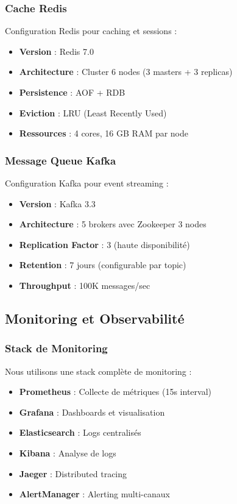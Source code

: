 \subsubsection{Cache Redis}

Configuration Redis pour caching et sessions :
\begin{itemize}
    \item \textbf{Version} : Redis 7.0
    \item \textbf{Architecture} : Cluster 6 nodes (3 masters + 3 replicas)
    \item \textbf{Persistence} : AOF + RDB
    \item \textbf{Eviction} : LRU (Least Recently Used)
    \item \textbf{Ressources} : 4 cores, 16 GB RAM par node
\end{itemize}

\subsubsection{Message Queue Kafka}

Configuration Kafka pour event streaming :
\begin{itemize}
    \item \textbf{Version} : Kafka 3.3
    \item \textbf{Architecture} : 5 brokers avec Zookeeper 3 nodes
    \item \textbf{Replication Factor} : 3 (haute disponibilité)
    \item \textbf{Retention} : 7 jours (configurable par topic)
    \item \textbf{Throughput} : 100K messages/sec
\end{itemize}

\subsection{Monitoring et Observabilité}

\subsubsection{Stack de Monitoring}

Nous utilisons une stack complète de monitoring :
\begin{itemize}
    \item \textbf{Prometheus} : Collecte de métriques (15s interval)
    \item \textbf{Grafana} : Dashboards et visualisation
    \item \textbf{Elasticsearch} : Logs centralisés
    \item \textbf{Kibana} : Analyse de logs
    \item \textbf{Jaeger} : Distributed tracing
    \item \textbf{AlertManager} : Alerting multi-canaux
\end{itemize}


